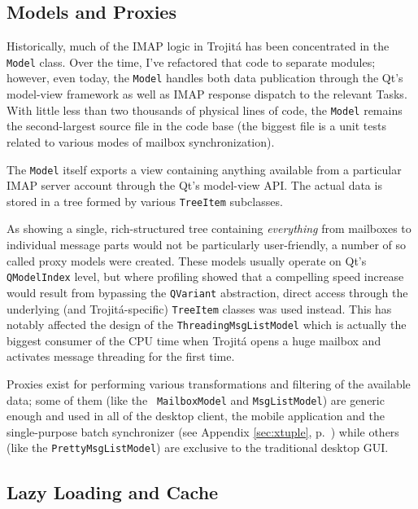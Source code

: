 \documentclass[trojita]{subfiles}
\begin{document}
\subsection{Models and Proxies}

Historically, much of the IMAP logic in Trojitá has been concentrated in the {\tt Model} class.  Over the time, I've
refactored that code to separate modules; however, even today, the {\tt Model} handles both data publication through the
Qt's model-view framework as well as IMAP response dispatch to the relevant Tasks.  With little less than two thousands
of physical lines of code, the {\tt Model} remains the second-largest source file in the code base (the biggest file is
a unit tests related to various modes of mailbox synchronization).

The {\tt Model} itself exports a view containing anything available from a particular IMAP server account through the
Qt's model-view API.  The actual data is stored in a tree formed by various {\tt TreeItem} subclasses.

As showing a single, rich-structured tree containing {\em everything} from mailboxes to individual message parts would
not be particularly user-friendly, a number of so called proxy models were created.  These models usually operate on
Qt's {\tt QModelIndex} level, but where profiling showed that a compelling speed increase would result from bypassing
the {\tt QVariant} abstraction, direct access through the underlying (and Trojitá-specific) {\tt TreeItem} classes was
used instead.  This has notably affected the design of the {\tt ThreadingMsgListModel} which is actually the biggest
consumer of the CPU time when Trojitá opens a huge mailbox and activates message threading for the first time.

Proxies exist for performing various transformations and filtering of the available data; some of them (like the {\tt
MailboxModel} and {\tt MsgListModel}) are generic enough and used in all of the desktop client, the mobile application
and the single-purpose batch synchronizer (see Appendix \ref{sec:xtuple}, p.~\pageref{sec:xtuple}) while others (like
the {\tt PrettyMsgListModel}) are exclusive to the traditional desktop GUI.

\subsection{Lazy Loading and Cache}
\end{document}
